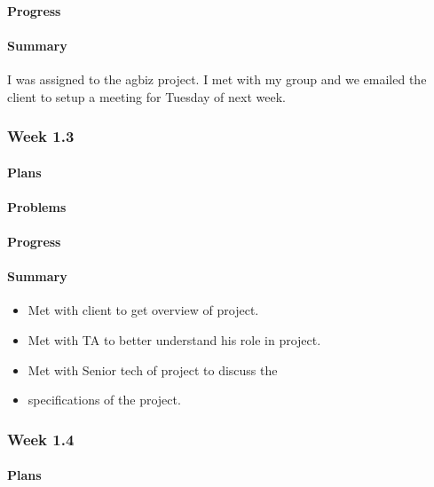 \documentclass[onecolumn, draftclsnofoot,10pt, compsoc]{article}
\begin{document}
		    \paragraph{Progress} \hfill \break

		    \paragraph{Summary} \hfill \break
		        I was assigned to the agbiz project. I met with my group and we emailed the client to setup a meeting for Tuesday of next week.
		    \\

		\subsubsection{Week 1.3}

		    \paragraph{Plans} \hfill \break

		    \paragraph{Problems} \hfill \break

		    \paragraph{Progress} \hfill \break

		    \paragraph{Summary} \hfill \break
		    	\begin{itemize}
		        \item Met with client to get overview of project.
                \item Met with TA to better understand his role in project.
                \item Met with Senior tech of project to discuss the \item specifications of the project.
                \end{itemize}

		\subsubsection{Week 1.4}
			\paragraph{Plans} \hfill \break
\end{document}
